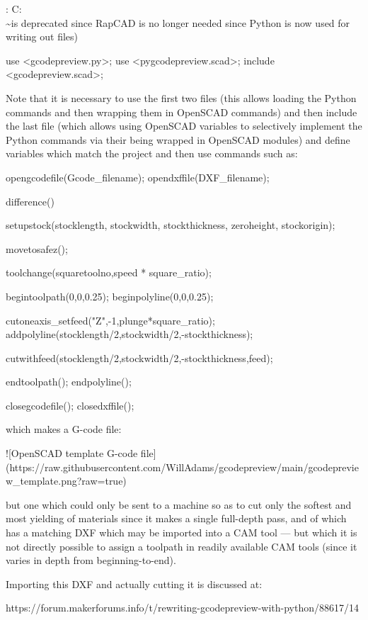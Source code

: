 \documentclass{ltxdoc}
\begin{document}
\begin{readme}
[^libraries]: C:\Users\\\~\Documents\RapCAD\libraries is deprecated since RapCAD is no longer needed since Python is now used for writing out files)

    use <gcodepreview.py>;
    use <pygcodepreview.scad>;
    include <gcodepreview.scad>;

Note that it is necessary to use the first two files 
(this allows loading the Python commands and then 
wrapping them in OpenSCAD commands) and then include 
the last file (which allows using OpenSCAD variables 
to selectively implement the Python commands via their 
being wrapped in OpenSCAD modules) and define 
variables which match the project and then use 
commands such as:

    opengcodefile(Gcode_filename);
    opendxffile(DXF_filename);
    
    difference() {
        setupstock(stocklength, stockwidth, stockthickness, zeroheight, stockorigin);
    
    movetosafez();
    
    toolchange(squaretoolno,speed * square_ratio);
    
    begintoolpath(0,0,0.25);
    beginpolyline(0,0,0.25);

    cutoneaxis_setfeed("Z",-1,plunge*square_ratio);
    addpolyline(stocklength/2,stockwidth/2,-stockthickness);
    
    cutwithfeed(stocklength/2,stockwidth/2,-stockthickness,feed);
    
    endtoolpath();
    endpolyline();
    
    }
    
    closegcodefile();
    closedxffile();

which makes a G-code file:

![OpenSCAD template G-code file](https://raw.githubusercontent.com/WillAdams/gcodepreview/main/gcodepreview_template.png?raw=true)

but one which could only be sent to a machine so as to 
cut only the softest and most yielding of materials 
since it makes a single full-depth pass, and of which 
has a matching DXF which may be imported into a 
CAM tool --- but which it is not directly possible 
to assign a toolpath in readily available CAM tools 
(since it varies in depth from beginning-to-end). 

Importing this DXF and actually cutting it 
is discussed at:

https://forum.makerforums.info/t/rewriting-gcodepreview-with-python/88617/14


\end{readme}
\end{document}

